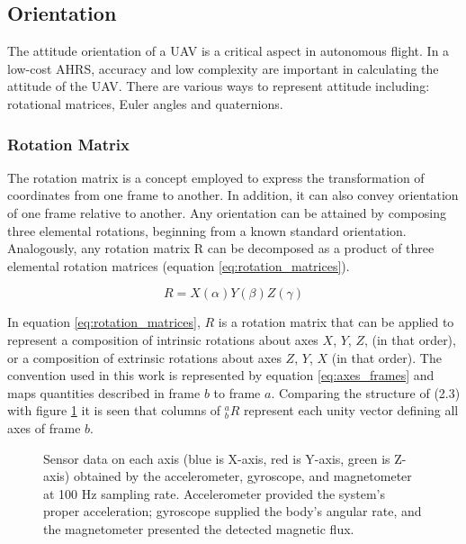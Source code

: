 \subsection{Orientation}

The attitude orientation of a UAV is a critical aspect in autonomous flight. In a low-cost
AHRS, accuracy and low complexity are important in calculating the attitude of the UAV.
There are various ways to represent attitude including: rotational matrices, Euler angles and quaternions.

\subsubsection{Rotation Matrix}

The rotation matrix is a concept employed to express the transformation of coordinates from one frame to another. In addition, it can also convey orientation of one frame relative to another. Any orientation can be attained by composing three elemental rotations, beginning from a known standard orientation. Analogously, any rotation matrix R can be decomposed as a product of three elemental rotation matrices (equation \ref{eq:rotation_matrices}).

\begin{equation}
    R = X(\alpha)Y(\beta)Z(\gamma)
    \label{eq:rotation_matrices}
\end{equation}

In equation \ref{eq:rotation_matrices}, $R$ is a rotation matrix that can be applied to represent a composition of intrinsic rotations about axes $X$, $Y$, $Z$, (in that order), or a composition of extrinsic rotations about axes $Z$, $Y$, $X$ (in that order). The convention used in this work is represented by equation \ref{eq:axes_frames} and maps quantities described in frame $b$ to frame $a$. Comparing the structure of (2.3) with figure \ref{fig:axes_frames} it is seen that columns of $^a_bR$ represent each unity vector defining all axes of frame $b$.


\begin{figure}[!h]
    \centering
    \resizebox{0.49\linewidth}{!}{}
    \resizebox{0.49\linewidth}{!}{}
    \caption{Sensor data on each axis (blue is X-axis, red is Y-axis, green is Z-axis) obtained by the accelerometer, gyroscope, and magnetometer at 100 Hz sampling rate. Accelerometer provided the system’s proper acceleration; gyroscope supplied the body’s angular rate, and the magnetometer presented the detected magnetic flux.}
    \label{fig:axes_frames}
\end{figure}

